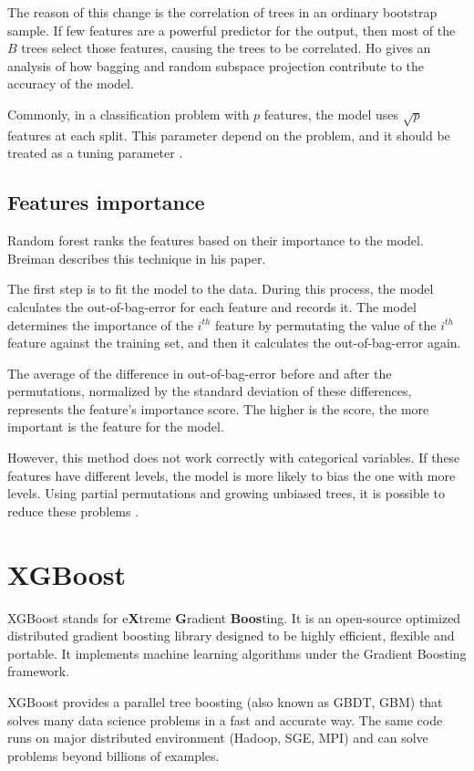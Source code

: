 The reason of this change is the correlation of trees in an ordinary bootstrap sample. If few features are a powerful predictor for the output, then most of the $B$ trees select those features, causing the trees to be correlated. Ho \cite{ho2002data} gives an analysis of how bagging and random subspace projection contribute to the accuracy of the model. 

Commonly, in a classification problem with $p$ features, the model uses $\sqrt{p}$ features at each split. This parameter depend on the problem, and it should be treated as a tuning parameter \cite{hastie2009elements}.

\subsection{Features importance}
Random forest ranks the features based on their importance to the model. Breiman \cite{breiman2001random} describes this technique in his paper. 

The first step is to fit the model to the data. During this process, the model calculates the out-of-bag-error for each feature and records it. The model determines the importance of the $i^{th}$ feature by permutating the value of the $i^{th}$ feature against the training set, and then it calculates the out-of-bag-error again. 

The average of the difference in out-of-bag-error before and after the permutations, normalized by the standard deviation of these differences, represents the feature's importance score.
The higher is the score, the more important is the feature for the model.

However, this method does not work correctly with categorical variables. If these features have different levels, the model is more likely to bias the one with more levels. Using partial permutations and growing unbiased trees, it is possible to reduce these problems \cite{deng2011bias}.

\section{XGBoost}
XGBoost stands for e\textbf{X}treme \textbf{G}radient \textbf{Boos}ting. It is an open-source optimized distributed gradient boosting library designed to be highly efficient, flexible and portable. It implements machine learning algorithms under the Gradient Boosting framework. 

XGBoost provides a parallel tree boosting (also known as GBDT, GBM) that solves many data science problems in a fast and accurate way. The same code runs on major distributed environment (Hadoop, SGE, MPI) and can solve problems beyond billions of examples. \cite{xgboost}


